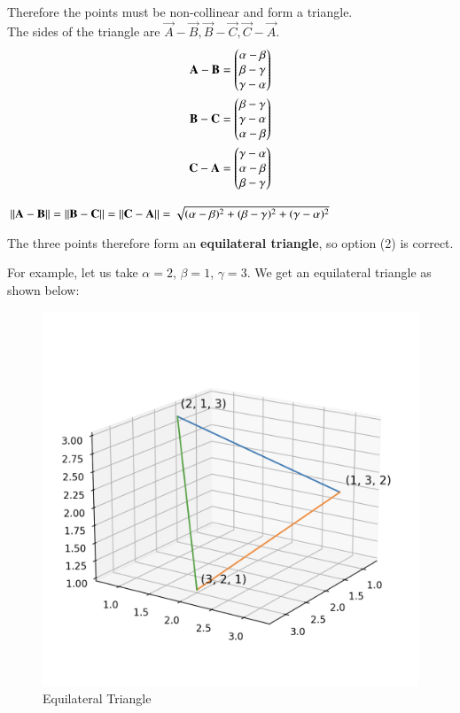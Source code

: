 \documentclass[12pt]{article}
\begin{document}
Therefore the points must be non-collinear and form a triangle.\\

The sides of the triangle are $\vec{A} - \vec{B}, \vec{B} - \vec{C}, \vec{C}- \vec{A}$.\\

\begin{align}
\mathbf{A-B} = \begin{pmatrix}\alpha - \beta \\ \beta - \gamma \\ \gamma - \alpha\end{pmatrix} \\
\mathbf{B-C} = \begin{pmatrix}\beta - \gamma \\ \gamma - \alpha \\ \alpha - \beta\end{pmatrix} \\
\mathbf{C-A} = \begin{pmatrix}\gamma - \alpha \\ \alpha - \beta \\ \beta - \gamma\end{pmatrix}
\end{align}


$\left\lVert\mathbf{A}-\mathbf{B}\right\rVert = \left\lVert\mathbf{B}-\mathbf{C}\right\rVert = \left\lVert\mathbf{C}-\mathbf{A}\right\rVert = \sqrt{(\alpha - \beta)^2  + (\beta - \gamma)^2 + (\gamma - \alpha)^2}$ 

The three points therefore form an \textbf{equilateral triangle}, so option (2) is correct.

For example, let us take $\alpha = 2$, $\beta = 1$, $\gamma = 3$.
We get an equilateral triangle as shown below:

\begin{figure}[H]
    \centering
    \includegraphics[width=0.7\columnwidth]{Figs/Example.png}
    \caption{Equilateral Triangle}
    \label{fig:placeholder}
\end{figure}
\end{document}

